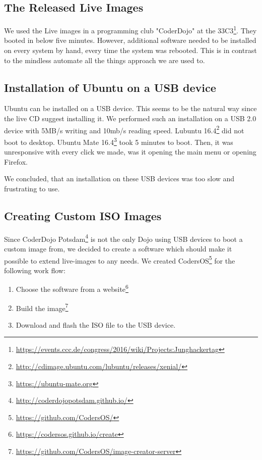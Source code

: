 \documentclass[english]{lni}
\begin{document}
\subsection{The Released Live Images}

We used the Live images in a programming club "CoderDojo" at the 33C3\footnote{\url{https://events.ccc.de/congress/2016/wiki/Projects:Junghackertag}}.
They booted in below five minutes.
However, additional software needed to be installed on every system by hand, every time the system  was rebooted.
This is in contrast to the mindless automate all the things approach we are used to.

\subsection{Installation of Ubuntu on a USB device}

Ubuntu can be installed on a USB device.
This seems to be the natural way since the live CD suggest installing it.
We performed such an installation on a USB 2.0 device with 5MB/s writing and 10mb/s reading speed.
Lubuntu 16.4\footnote{\url{http://cdimage.ubuntu.com/lubuntu/releases/xenial/}} did not boot to desktop. 
Ubuntu Mate 16.4\footnote{\url{https://ubuntu-mate.org}} took 5 minutes to boot.
Then, it was unresponsive with every click we made, was it opening the main menu or opening Firefox.

We concluded, that an installation on these USB devices was too slow and frustrating to use.

\subsection{Creating Custom ISO Images}
\label{sec:custom}

Since CoderDojo Potsdam\footnote{\url{http://coderdojopotsdam.github.io/}} is not the only Dojo using USB devices to boot a custom image from, we decided to create a software which should make it possible to extend live-images to any needs.
We created CodersOS\footnote{\url{https://github.com/CodersOS/}} for the following work flow:

\begin{enumerate}
  \item Choose the software from a website\footnote{\url{https://codersos.github.io/create}}
  \item Build the image\footnote{\url{https://github.com/CodersOS/image-creator-server}}
  \item Download and flash the ISO file to the USB device.
\end{enumerate}
\end{document}
